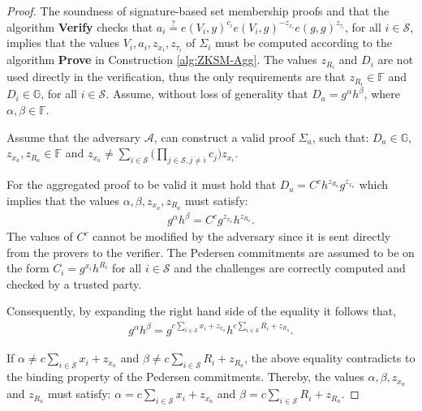 \begin{proof}
The soundness of signature-based set membership proofs and that the algorithm \textbf{Verify} checks that $a_i\overset{?}{=} e(V_i,y)^{c_i}e(V_i,g)^{-z_{x_i}}e(g,g)^{z_{\tau_i}}$,  for all $i\in\mathcal{S}$, implies that the values $V_i,a_i,z_{x_i},z_{\tau_i}$ of $\Sigma_i$ must be computed according to the algorithm \textbf{Prove} in Construction \ref{alg:ZKSM-Agg}. The values $z_{R_i}$ and $D_i$ are not used directly in the verification, thus the only requirements are that $z_{R_i}\in\mathds{F}$ and $D_i\in\mathds{G}$, for all $i\in\mathcal{S}$.  Assume, without loss of generality that  $D_a=g^\alpha h^\beta$, where $\alpha,\beta\in\mathds{F}$. 

Assume that the adversary $\mathcal{A}$, can construct a valid proof $\Sigma_a$, such that: $D_a\in\mathds{G}$, $z_{x_a},z_{R_a}\in\mathds{F}$ and  $z_{x_a} \neq \sum_{i\in\mathcal{S}} \Big( \prod_{j\in\mathcal{S}, j\neq i} c_j \big) z_{x_i}$. 


For the aggregated proof to be valid it must hold that $D_a= C^ch^{z_{R_a}}g^{z_{x_a}}$ which implies that the values $\alpha,\beta,z_{x_a},z_{R_a}$ must satisfy:
\begin{align*}
g^\alpha h^\beta  = C^cg^{z_{x_a}}h^{z_{R_a}}.
\end{align*}
The values of $C^c $ cannot be modified by the adversary since it is sent directly from the provers to the verifier. The Pedersen commitments are assumed to be on the form $C_i= g^{x_i}h^{R_i}$ for all $i\in\mathcal{S}$ and the challenges are correctly computed and checked by a trusted party.

Consequently, by expanding the right hand side of the equality it follows that,
\begin{align*}
g^\alpha h^\beta =  g^{c \sum_{i\in\mathcal{S}}x_i +z_{x_a} } h^{ c \sum_{i\in\mathcal{S}}R_i +z_{R_a}   }.
\end{align*}

If $\alpha \neq c \sum_{i\in\mathcal{S}} x_i+z_{x_a}$ and $\beta\neq c\sum_{i\in\mathcal{S}}R_i +z_{R_a}$, the above equality contradicts to the binding property of the Pedersen commitments.  %
Thereby, the values $\alpha, \beta , z_{x_a}$ and $z_{R_a}$ must satisfy: 
$\alpha =  c \sum_{i\in\mathcal{S}} x_i+z_{x_a}$ 
and 
$\beta =  c \sum_{i\in\mathcal{S}} R_i +z_{R_a}$.  


\end{proof}
